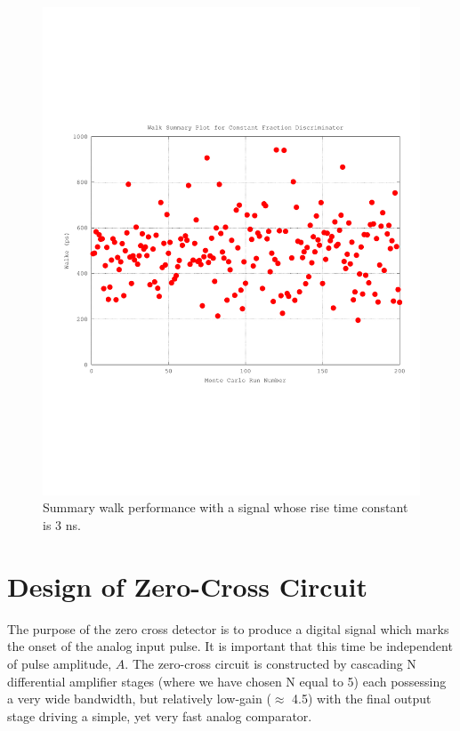 \documentclass[12pt, onecolumn]{IEEEtran}
\begin{document}
\begin{figure}[htbp!]
	\centering
 	\includegraphics[scale=0.85,keepaspectratio=true]{./images/summary_walk.pdf} 	
 	\caption{Summary walk performance with a signal whose rise time constant is 3 ns.}
 	\label{FIG:SUMMARY_WALK}
\end{figure}
\section*{Design of Zero-Cross Circuit}


The purpose of the zero cross detector is to produce a digital signal which marks the onset of the analog input pulse. It is important that this time be independent of pulse amplitude, $A$.  The zero-cross circuit is constructed by cascading N differential amplifier stages (where we have chosen N equal to 5) each possessing a very wide bandwidth, but relatively low-gain ($\approx$ 4.5) with the final output stage driving a simple, yet very fast analog comparator.\\  
\end{document}

